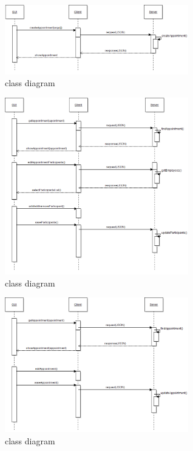 \documentclass[a4paper, 10pt]{article}
\begin{document}
\begin{figure}[h!] 
    \begin{center}  
        \includegraphics[width=8cm]{img/seqCreateAppointment.png}
        \caption{class diagram}
    \label{class}
    \end{center}
\end{figure}

\begin{figure}[h!] 
    \begin{center}  
        \includegraphics[width=8cm]{img/seqManageParticipants.png}
        \caption{class diagram}
    \label{class}
    \end{center}
\end{figure}

\begin{figure}[h!] 
    \begin{center}  
        \includegraphics[width=8cm]{img/seqEditAppointment.png}
        \caption{class diagram}
    \label{class}
    \end{center}
\end{figure}
\end{document}
